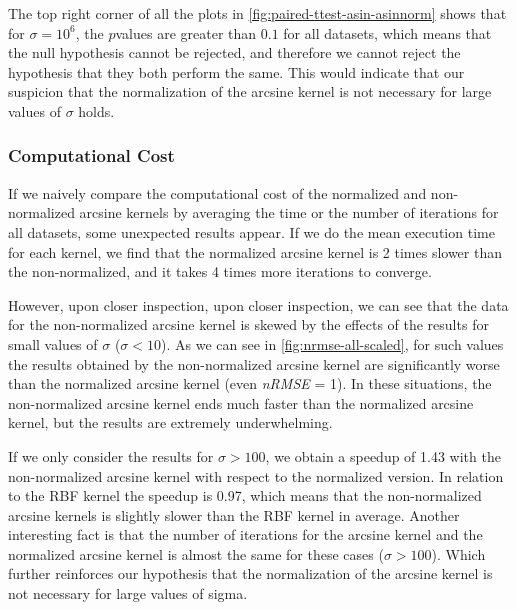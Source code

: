 The top right corner of all the plots in \cref{fig:paired-ttest-asin-asinnorm} shows
that for $\sigma = 10^6$, the $p$\textendash{}values are greater than $0.1$ for all datasets,
which means that the null hypothesis cannot be rejected, and therefore we cannot reject
the hypothesis that they both perform the same. This would indicate that our suspicion
that the normalization of the arcsine kernel is not necessary for large values of
$\sigma$ holds.

\subsubsection{Computational Cost}

If we naively compare the computational cost of the normalized and non-normalized
arcsine kernels by averaging the time or the number of iterations for all datasets,
some unexpected results appear. If we do the mean execution time for each kernel,
we find that the normalized arcsine kernel is 2 times slower than the non-normalized,
and it takes 4 times more iterations to converge.

However, upon closer inspection, upon closer inspection, we can see that the data
for the non-normalized arcsine kernel is skewed by the effects of the results for
small values of $\sigma$ ($\sigma < 10$). As we can see in \cref{fig:nrmse-all-scaled},
for such values the results obtained by the non-normalized arcsine kernel are
significantly worse than the normalized arcsine kernel (even \emph{nRMSE} = 1).
In these situations, the non-normalized arcsine kernel ends much faster than the
normalized arcsine kernel, but the results are extremely underwhelming.

If we only consider the results for $\sigma > 100$, we obtain a speedup
of 1.43 with the non-normalized arcsine kernel with respect to the normalized
version. In relation to the RBF kernel the speedup is 0.97, which means that
the non-normalized arcsine kernels is slightly slower than the RBF kernel in
average. Another interesting fact is that the number of iterations for the
arcsine kernel and the normalized arcsine kernel is almost the same for these
cases ($\sigma > 100$). Which further reinforces our hypothesis that the
normalization of the arcsine kernel is not necessary for large values of sigma.

